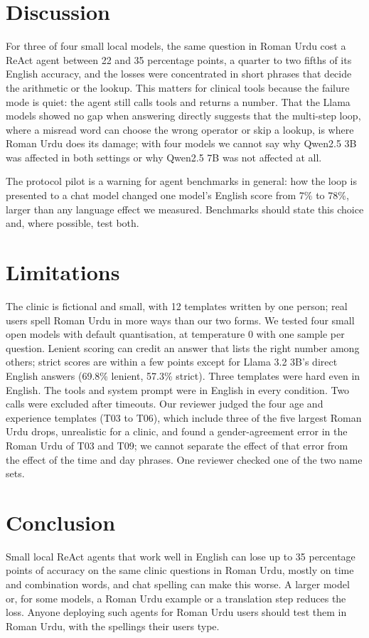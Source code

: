 \documentclass[11pt]{article}
\begin{document}
\section{Discussion}
For three of four small local models, the same question in Roman Urdu cost a ReAct agent between 22 and 35 percentage points, a quarter to two fifths of its English accuracy, and the losses were concentrated in short phrases that decide the arithmetic or the lookup. This matters for clinical tools because the failure mode is quiet: the agent still calls tools and returns a number. That the Llama models showed no gap when answering directly suggests that the multi-step loop, where a misread word can choose the wrong operator or skip a lookup, is where Roman Urdu does its damage; with four models we cannot say why Qwen2.5 3B was affected in both settings or why Qwen2.5 7B was not affected at all.

The protocol pilot is a warning for agent benchmarks in general: how the loop is presented to a chat model changed one model's English score from 7\% to 78\%, larger than any language effect we measured. Benchmarks should state this choice and, where possible, test both.

\section{Limitations}
The clinic is fictional and small, with 12 templates written by one person; real users spell Roman Urdu in more ways than our two forms. We tested four small open models with default quantisation, at temperature 0 with one sample per question. Lenient scoring can credit an answer that lists the right number among others; strict scores are within a few points except for Llama 3.2 3B's direct English answers (69.8\% lenient, 57.3\% strict). Three templates were hard even in English. The tools and system prompt were in English in every condition. Two calls were excluded after timeouts. Our reviewer judged the four age and experience templates (T03 to T06), which include three of the five largest Roman Urdu drops, unrealistic for a clinic, and found a gender-agreement error in the Roman Urdu of T03 and T09; we cannot separate the effect of that error from the effect of the time and day phrases. One reviewer checked one of the two name sets.

\section{Conclusion}
Small local ReAct agents that work well in English can lose up to 35 percentage points of accuracy on the same clinic questions in Roman Urdu, mostly on time and combination words, and chat spelling can make this worse. A larger model or, for some models, a Roman Urdu example or a translation step reduces the loss. Anyone deploying such agents for Roman Urdu users should test them in Roman Urdu, with the spellings their users type.
\end{document}
